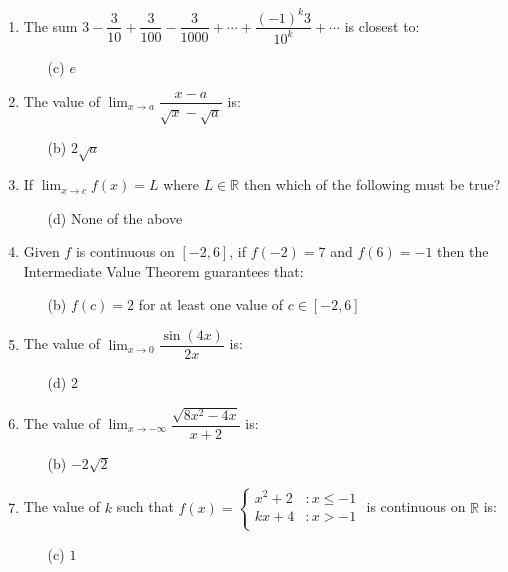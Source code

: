 \documentclass[12pt]{book}
\begin{document}
\begin{enumerate}

\item The sum $3-\dfrac{3}{10}+\dfrac{3}{100}-\dfrac{3}{1000} + \cdots + \dfrac{(-1)^k3}{10^k} + \cdots$ is closest to:
\begin{enumerate}
\item[(c)] $e$
\end{enumerate}

\item The value of $\lim_{x\to a}\limits \dfrac{x-a}{\sqrt{x} - \sqrt{a}}$ is:
\begin{enumerate}
\item[(b)] $2\sqrt{a}$
\end{enumerate}

\item If $\lim_{x\to c}\limits f(x) = L$ where $L \in \mathbb{R}$ then which of the following must be true?
\begin{enumerate}
\item[(d)] None of the above
\end{enumerate}

\item Given $f$ is continuous on $[-2,6]$, if $f(-2)=7$ and $f(6)=-1$ then the Intermediate Value Theorem guarantees that:
\begin{enumerate}
\item[(b)] $f(c)=2$ for at least one value of $c \in [-2,6]$
\end{enumerate}

\item The value of $\lim_{x\to 0}\limits \dfrac{\sin(4x)}{2x}$ is:
\begin{enumerate}
\item[(d)] $2$
\end{enumerate}

\item The value of $\lim_{x\to -\infty}\limits \dfrac{\sqrt{8x^2 - 4x}}{x+2}$ is:
\begin{enumerate}
\item[(b)] $-2\sqrt{2}$
\end{enumerate}

\item The value of $k$ such that $f(x) = \begin{cases} 
      x^2 + 2 & : x \le -1 \\
      kx+4 & : x>-1 \\
   \end{cases}$ is continuous on $\mathbb{R}$ is: 
\begin{enumerate}
\item[(c)] $1$
\end{enumerate}


\end{enumerate}
\end{document}
